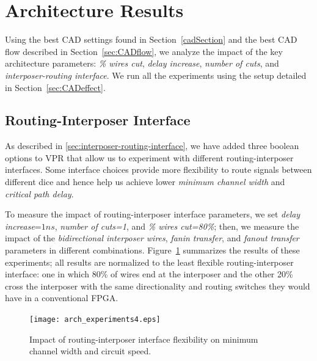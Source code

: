 \documentclass[journal]{IEEEtran}
\begin{document}


\section{Architecture Results}
\label{resultsSection}

Using the best CAD settings found in Section~\ref{cadSection} and the best CAD flow described in Section~\ref{sec:CADflow}, we analyze the impact of the key architecture parameters: \textit{\% wires cut}, \textit{delay increase}, \textit{number of cuts}, and \textit{interposer-routing interface}. We run all the experiments using the setup detailed in Section~\ref{sec:CADeffect}.

\subsection{Routing-Interposer Interface}
As described in \ref{sec:interposer-routing-interface}, we have added three boolean options to VPR that allow us to experiment with different routing-interposer interfaces. Some interface choices provide more flexibility to route signals between different dice and hence help us achieve lower \textit{minimum channel width} and \textit{critical path delay}.

To measure the impact of routing-interposer interface parameters, we set \textit{delay increase}=$1ns$, \textit{number of cuts=1}, and \textit{\% wires cut=80\%}; then, we measure the impact of the \textit{bidirectional interposer wires}, \textit{fanin transfer}, and \textit{fanout transfer} parameters in different combinations. Figure~\ref{fig:all_arch_experiments} summarizes the results of these experiments; all results are normalized to the least flexible routing-interposer interface: one in which 80\% of wires end at the interposer and the other 20\% cross the interposer with the same directionality and routing switches they would have in a conventional FPGA.

\begin{figure}[!h]
\centering
\texttt{[image: arch\_experiments4.eps]}
\caption{Impact of routing-interposer interface flexibility on minimum channel width and circuit speed.}
\label{fig:all_arch_experiments}
\end{figure}
\end{document}
